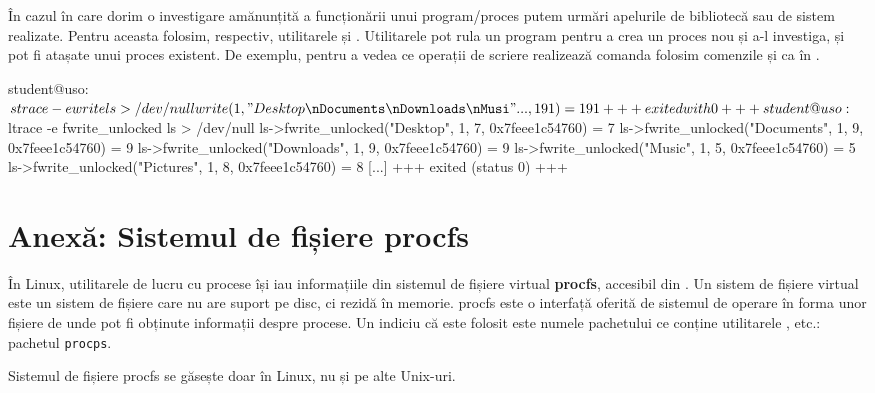În cazul în care dorim o investigare amănunțită a funcționării unui
program/proces putem urmări apelurile de bibliotecă sau de sistem realizate.
Pentru aceasta folosim, respectiv, utilitarele  și . Utilitarele pot
rula un program pentru a crea un proces nou și a-l investiga, și pot fi atașate
unui proces existent. De exemplu, pentru a vedea ce operații de scriere realizează comanda  folosim comenzile  și  ca în .

\begin{screen}[caption={Investigarea apelurilor de sistem și de blbliotecă},label={lst:process:trace}]
student@uso:~$ strace -e write ls > /dev/null
write(1, "Desktop\nDocuments\nDownloads\nMusi"..., 191) = 191
+++ exited with 0 +++
student@uso:~$ ltrace -e fwrite_unlocked ls > /dev/null
ls->fwrite_unlocked("Desktop", 1, 7, 0x7feee1c54760)                                                          = 7
ls->fwrite_unlocked("Documents", 1, 9, 0x7feee1c54760)                                                        = 9
ls->fwrite_unlocked("Downloads", 1, 9, 0x7feee1c54760)                                                        = 9
ls->fwrite_unlocked("Music", 1, 5, 0x7feee1c54760)                                                            = 5
ls->fwrite_unlocked("Pictures", 1, 8, 0x7feee1c54760)                                                         = 8
[...]
+++ exited (status 0) +++
\end{screen}

\section{Anexă: Sistemul de fișiere procfs}
\label{sec:process-proc}

În Linux, utilitarele de lucru cu procese își iau informațiile din sistemul de
fișiere virtual \textbf{procfs}, accesibil din . Un sistem de fișiere virtual este
un sistem de fișiere care nu are suport pe disc, ci rezidă în memorie. procfs
este o interfață oferită de sistemul de operare în forma unor fișiere de unde
pot fi obținute informații despre procese. Un indiciu că este folosit este
numele pachetului ce conține utilitarele ,  etc.: pachetul \texttt{procps}.

\begin{note}
Sistemul de fișiere procfs se găsește doar în Linux, nu și pe alte Unix-uri.
\end{note}

